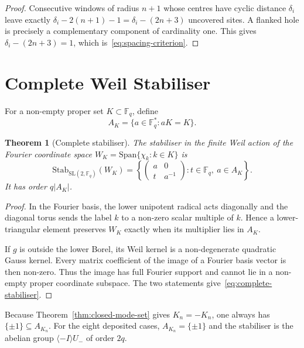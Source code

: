 \documentclass[11pt,a4paper]{article}
\newtheorem{theorem}{Theorem}[section]
\theoremstyle{definition}
\theoremstyle{remark}
\newcommand{\Fq}{\mathbb{F}_q}
\newcommand{\G}{\mathrm{SL}(2,\Fq)}
\newcommand{\Span}{\mathrm{Span}}
\newcommand{\Stab}{\mathrm{Stab}}
\begin{document}
\begin{proof}
  Consecutive windows of radius $n+1$ whose centres have cyclic distance $\delta_i$ leave
  exactly $\delta_i-2(n+1)-1=\delta_i-(2n+3)$ uncovered sites.
  A flanked hole is precisely a complementary component of cardinality one.
  This gives $\delta_i-(2n+3)=1$, which is~\eqref{eq:spacing-criterion}.
\end{proof}

\section{Complete Weil Stabiliser}
\label{sec:stabiliser}

For a non-empty proper set $K\subset\Fq$, define
\begin{equation}
  A_K=\{a\in\Fq^*:aK=K\}.
  \label{eq:AK}
\end{equation}

\begin{theorem}[Complete stabiliser]
  \label{thm:stabiliser}
  The stabiliser in the finite Weil action of the Fourier coordinate space
  $W_K=\Span\{\chi_k:k\in K\}$ is
  \begin{equation}
    \Stab_{\G}(W_K)
    =\left\{
      \begin{pmatrix}a&0\\t&a^{-1}\end{pmatrix}
      :t\in\Fq,\ a\in A_K
    \right\}.
    \label{eq:complete-stabiliser}
  \end{equation}
  It has order $q|A_K|$.
\end{theorem}

\begin{proof}
  In the Fourier basis, the lower unipotent radical acts diagonally and the diagonal torus
  sends the label $k$ to a non-zero scalar multiple of $k$.
  Hence a lower-triangular element preserves $W_K$ exactly when its multiplier lies in
  $A_K$.

  If $g$ is outside the lower Borel, its Weil kernel is a non-degenerate quadratic Gauss
  kernel.
  Every matrix coefficient of the image of a Fourier basis vector is then non-zero.
  Thus the image has full Fourier support and cannot lie in a non-empty proper coordinate
  subspace.
  The two statements give~\eqref{eq:complete-stabiliser}.
\end{proof}

Because Theorem~\ref{thm:closed-mode-set} gives $K_n=-K_n$, one always has
$\{\pm1\}\subseteq A_{K_n}$.
For the eight deposited cases, $A_{K_n}=\{\pm1\}$ and the stabiliser is the abelian group
$\langle-I\rangle U_-$ of order $2q$.
\end{document}
